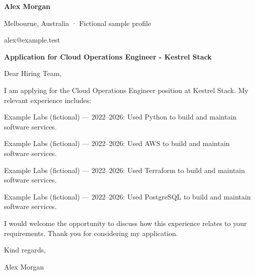 \documentclass[10pt,a4paper]{article}
\begin{document}
{\LARGE\bfseries\color{navy} Alex Morgan}\par
Melbourne, Australia · Fictional sample profile\par
alex@example.test\par
{\large\bfseries\color{navy} Application for Cloud Operations Engineer - Kestrel Stack}\par
Dear Hiring Team,\par
I am applying for the Cloud Operations Engineer position at Kestrel Stack. My relevant experience includes:\par
Example Labs (fictional) — 2022–2026: Used Python to build and maintain software services.\par
Example Labs (fictional) — 2022–2026: Used AWS to build and maintain software services.\par
Example Labs (fictional) — 2022–2026: Used Terraform to build and maintain software services.\par
Example Labs (fictional) — 2022–2026: Used PostgreSQL to build and maintain software services.\par
I would welcome the opportunity to discuss how this experience relates to your requirements. Thank you for considering my application.\par
Kind regards,\par
Alex Morgan\par
\end{document}
